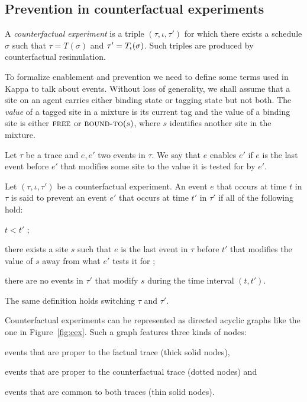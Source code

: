 \subsection{Prevention in counterfactual experiments}
\label{subsec:cex}\label{subsec:inhibition}

A \textit{counterfactual experiment} is a triple $(\tau, \iota, \tau')$ for
which there exists a schedule $\sigma$ such that $\tau = T(\sigma)$ and $\tau' =
{T_\iota}{}(\sigma)$. Such triples are produced by counterfactual resimulation.

To formalize enablement and prevention we need to define some terms used in
Kappa to talk about events. Without loss of generality, we shall assume that a
site on an agent carries either binding state or tagging state but not both. The
\textit{value} of a tagged site in a mixture is its current tag and the value of
a binding site is either $\textsc{free}$ or $\textsc{bound-to}(s)$, where $s$
identifies another site in the mixture. 



\begin{definition}[Enablement]
  Let $\tau$ be a trace and $e, e'$ two events in $\tau$.  We say that
  $e$ enables $e'$ if $e$ is the last event before $e'$ that modifies
  some site to the value it is tested for by $e'$.
\end{definition}

\begin{definition}[Prevention]
  Let $(\tau, \iota, \tau')$ be a counterfactual experiment. An event
  $e$ that occurs at time $t$ in $\tau$ is said to prevent an event
  $e'$ that occurs at time $t'$ in $\tau'$ if all of the following
  hold:
  \begin{inparaenum}[(1)]
  \item \label{inhibition:time} $t < t'$ ;
  \item \label{inhibition:breaks} there exists a site $s$ such that
    $e$ is the last event in $\tau$ before $t'$ that modifies the
    value of $s$ away from what $e'$ tests it for ;
  \item \label{inhibition:nointf} there are no events in $\tau'$ that
    modify $s$ during the time interval $(t, t')$.
  \end{inparaenum}
  The same definition holds switching $\tau$ and $\tau'$.
\end{definition}

Counterfactual experiments can be represented as directed acyclic
graphs like the one in Figure~\ref{fig:cex}. Such a graph features
three kinds of nodes:
\begin{inparaenum}[]
\item events that are proper to the factual trace (thick solid nodes),
\item events that are proper to the counterfactual trace (dotted
  nodes) and
\item events that are common to both traces (thin solid nodes).
\end{inparaenum}

